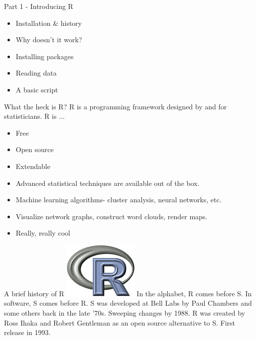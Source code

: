 \documentclass[xcolor=dvipsnames]{beamer}
\begin{document}
\begin{frame}{Part 1 - Introducing R}
  \begin{itemize}
    \item Installation \& history
    \item Why doesn't it work?
    \item Installing packages
    \item Reading data
    \item A basic script
  \end{itemize}
\end{frame}

\begin{frame}{What the heck is R?}
  R is a programming framework designed by and for statisticians. R is ... 
  \begin{itemize}
    \item Free %
    \item Open source %
    \item Extendable %
    \item Advanced statistical techniques are available out of the box. 
    \item Machine learning algorithms- cluster analysis, neural networks, etc.%
    \item Visualize network graphs, construct word clouds, render maps. %
    \item Really, really cool 
  \end{itemize}
\end{frame}

\begin{frame}{A brief history of R}
\includegraphics[width=0.27\textwidth]{figure/R}
\newline
In the alphabet, R comes before S. In software, S comes before R.
\newline
\newline
S was developed at Bell Labs by Paul Chambers and some others back in the late '70s. Sweeping changes by 1988.
R was created by Ross Ihaka and Robert Gentleman as an open source alternative to S. First release in 1993.
\end{frame}
\end{document}
